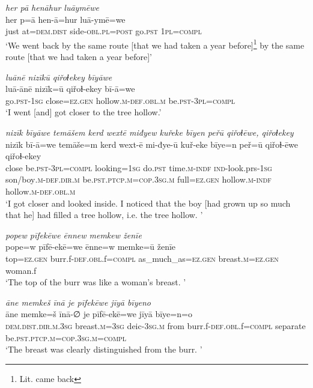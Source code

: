 \ea \label{ZQ.34}
\textit{her pā henāhur luāymēwe} \\ 
\gll her p=ā hen-ā=hur luā-ymē=we \\ 
 just at=\textsc{dem.dist} side\textsc{-obl}\textsc{.pl}\textsc{=\textsc{post}} go\textsc{.pst} \textsc{1pl}\textsc{=compl} \\ 
\glt `We went back by the same route [that we had taken a year before]\footnote{Lit. came back} by the same route [that we had taken a year before]'
\z 
 
\ea \label{ZQ.36}
\textit{luānē nizīkū qiřoɫekey bīyāwe} \\ 
\gll luā-ānē nizīk=ū qiřoɫ-ekey bī-ā=we \\ 
 go\textsc{.pst}\textsc{-\textsc{1sg}} close=\textsc{ez.gen} hollow\textsc{.m}\textsc{-def}\textsc{.obl}\textsc{.m} be\textsc{.pst}\textsc{-3pl}\textsc{=compl} \\ 
\glt `I went [and] got closer to the tree hollow.'
\z 
 
\ea \label{ZQ.38}
\textit{nizīk bīyāwe temāšem kerd wextē miđyew kuřeke bīyen peřū qiřoɫēwe, qiřoɫekey} \\ 
\gll nizīk bī-ā=we temāše=m kerd wext-ē mi-đye-ū kuř-eke bīye=n peř=ū qiřoɫ-ēwe qiřoɫ-ekey \\ 
 close be\textsc{.pst}\textsc{-3pl}\textsc{=compl} looking\textsc{=\textsc{1sg}} do\textsc{.pst} time\textsc{.m}\textsc{-indf} \textsc{ind-}look.prs\textsc{-\textsc{1sg}} son/boy\textsc{.m}\textsc{-def}\textsc{.dir}\textsc{.m} be\textsc{.pst}\textsc{.ptcp}\textsc{.m}\textsc{=cop}\textsc{.3sg}\textsc{.m} full\textsc{=ez.gen} hollow\textsc{.m}\textsc{-indf} hollow\textsc{.m}\textsc{-def}\textsc{.obl}\textsc{.m} \\ 
\glt `I got closer and looked inside. I noticed that the boy [had grown up so much that he] had filled a tree hollow, i.e. the tree hollow. '
\z 
 
\ea \label{ZQ.40}
\textit{popew pīfekēwe ēnnew memkew ženīe} \\ 
\gll pope=w pīfē-ekē=we ēnne=w memke=ū ženīe \\ 
 top\textsc{=ez.gen} burr.f\textsc{-def}\textsc{.obl}.f\textsc{=compl} as\_much\_as\textsc{=ez.gen} breast\textsc{.m}\textsc{=ez.gen} woman.f \\ 
\glt `The top of the burr was like a woman’s breast. '
\z 
 
\ea \label{ZQ.41}
\textit{āne memkeš īnā je pīfekēwe jīyā bīyeno} \\ 
\gll āne memke=š īnā-∅ je pīfē-ekē=we jīyā bīye=n=o \\ 
 \textsc{dem.dist}\textsc{.dir}\textsc{.m}\textsc{.3sg} breast\textsc{.m}\textsc{=3sg} deic\textsc{-3sg}\textsc{.m} from burr.f\textsc{-def}\textsc{.obl}.f\textsc{=compl} separate be\textsc{.pst}\textsc{.ptcp}\textsc{.m}\textsc{=cop}\textsc{.3sg}\textsc{.m}\textsc{=compl} \\ 
\glt `The breast was clearly distinguished from the burr. '
\z 
 
